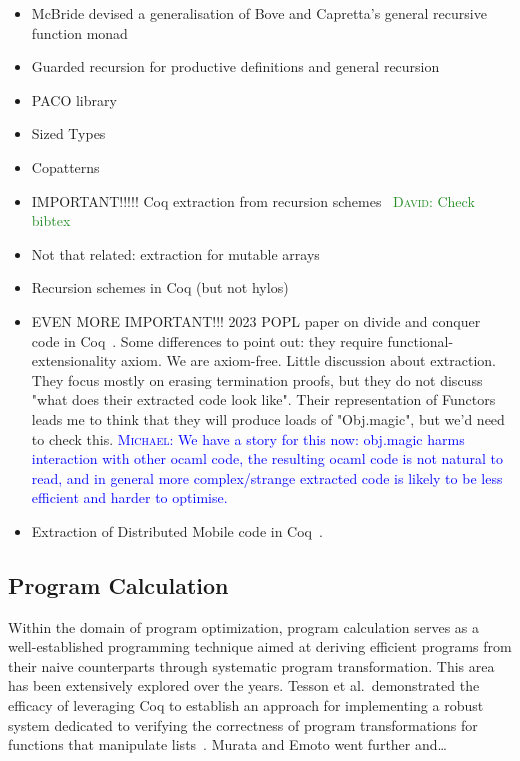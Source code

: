 \documentclass[a4paper, UKenglish, cleveref, autoref, thm-restate]{lipics-v2021}
\newcommand{\dcas}[1]{\textcolor{ForestGreen}{\textsc{David}: #1}}
\newcommand{\mvol}[1]{\textcolor{blue}{\textsc{Michael}: #1}}
\begin{document}
\begin{itemize}
  \item McBride devised a generalisation of Bove and Capretta's general
recursive function monad~\cite{McBride15, BoveC01}
  \item Guarded recursion for productive definitions and general recursion
~\cite{AtkeyM13, PaviottiMB15}
  \item PACO library~\cite{HurNDV13}
  \item Sized Types \cite{HughesPS96, abs-1202-3496}
  \item Copatterns \cite{AbelPTS13, AbelP16}
  \item IMPORTANT!!!!! Coq extraction from recursion
    schemes~\cite{larchey2022braga} \dcas{Check bibtex}
  \item Not that related: extraction for mutable arrays~\cite{SAKAGUCHI2020102372}
  \item Recursion schemes in Coq (but not hylos)~\cite{MurataE19}
  \item EVEN MORE IMPORTANT!!! 2023 POPL paper on divide and conquer code in
    Coq~\cite{AbreuDHJMS23}.  Some differences to point out: they require
    functional-extensionality axiom. We are axiom-free. Little discussion about
    extraction. They focus mostly on erasing termination proofs, but they do
    not discuss "what does their extracted code look like". Their
    representation of Functors leads me to think that they will produce loads
        of "Obj.magic", but we'd need to check this. \mvol{We have a story for this now: obj.magic harms interaction with other ocaml code, the resulting ocaml code is not natural to read, and in general more complex/strange extracted code is likely to be less efficient and harder to optimise.}
        \item Extraction of Distributed Mobile code in Coq~\cite{MiculanP12}.
\end{itemize}

\subsection{Program Calculation}

Within the domain of program optimization, program calculation serves as a
well-established programming technique aimed at deriving efficient programs from
their naive counterparts through systematic program transformation. This area
has been extensively explored over the years. Tesson et al.\ demonstrated the
efficacy of leveraging Coq to establish an approach for implementing a robust
system dedicated to verifying the correctness of program transformations for
functions that manipulate lists~\cite{10.1007/978-3-642-17796-5_10}. Murata and
Emoto went further and\ldots~\cite{MurataE19}
\end{document}
